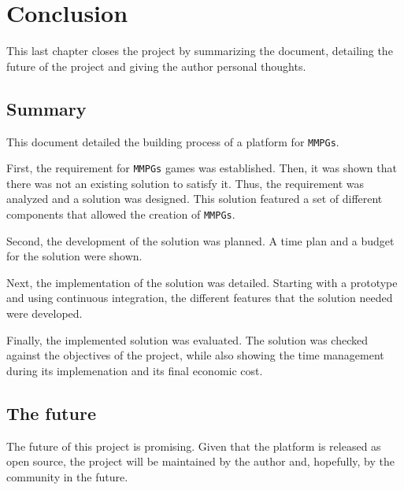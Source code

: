 \documentclass[a4paper,11pt,titlepage,abstract,numbers=noenddot,automark,mnsy,intlimits,rgb,dvipsnames]{report}
\begin{document}
\chapter{Conclusion}
This last chapter closes the project by summarizing the document, detailing the future of the project and
giving the author personal thoughts.
\section{Summary}
This document detailed the building process of a platform for \texttt{MMPGs}.

First, the requirement for \texttt{MMPGs} games was established. Then, it was shown that there was not
an existing solution to satisfy it. Thus, the requirement was analyzed and a solution was designed. This solution
featured a set of different components that allowed the creation of \texttt{MMPGs}.

Second, the development of the solution was planned. A time plan and a budget for the solution were shown.

Next, the implementation of the solution was detailed. Starting with a prototype and using continuous integration, the different
features that the solution needed were developed.

Finally, the implemented solution was evaluated. The solution was checked against the objectives of the project,
while also showing the time management during its implemenation and its final economic cost.
\section{The future}
The future of this project is promising. Given that the platform is released as open source, the project will be maintained
by the author and, hopefully, by the community in the future.
\end{document}
